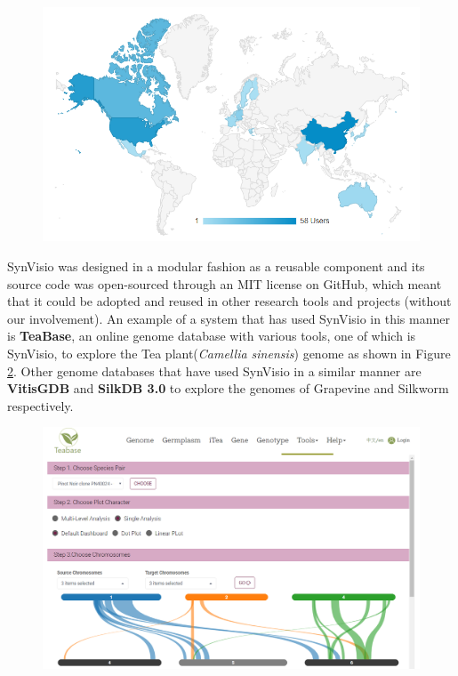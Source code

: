 \begin{figure}
  \centering
  \includegraphics[width=1\linewidth]{images/ch_6_users.PNG}
  \label{fig:ch_6_users}
\end{figure}


SynVisio was designed in a modular fashion as a reusable component and its source code was open-sourced through an MIT license on GitHub\cite{synvisio}, which meant that it could be adopted and reused in other research tools and projects (without our involvement). An example of a system that has used SynVisio in this manner is \textbf{TeaBase}, an online genome database with various tools, one of which is SynVisio, to explore the Tea plant(\textit{Camellia sinensis}) genome as shown in Figure \ref{fig:ch_6_other}\cite{teabase}. Other genome databases that have used SynVisio in a similar manner are \textbf{VitisGDB} and  \textbf{SilkDB 3.0} to explore the genomes of Grapevine and Silkworm respectively\cite{lu2020silkdb,vitisgdb}.

\begin{figure}[h]
  \centering
  \includegraphics[width=1\linewidth]{images/ch_6_other.PNG}
  \label{fig:ch_6_other}
\end{figure}


